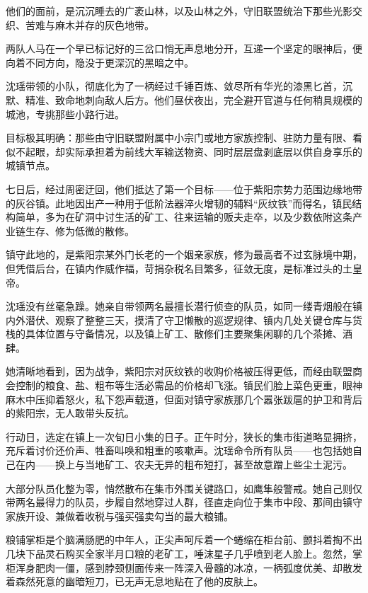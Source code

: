 他们的面前，是沉沉睡去的广袤山林，以及山林之外，守旧联盟统治下那些光影交织、苦难与麻木并存的灰色地带。

两队人马在一个早已标记好的三岔口悄无声息地分开，互递一个坚定的眼神后，便向着不同方向，隐没于更深沉的黑暗之中。

\vspace{2em}

沈瑶带领的小队，彻底化为了一柄经过千锤百炼、敛尽所有华光的漆黑匕首，沉默、精准、致命地刺向敌人后方。他们昼伏夜出，完全避开官道与任何稍具规模的城池，专挑那些小路行进。

目标极其明确：那些由守旧联盟附属中小宗门或地方家族控制、驻防力量有限、看似不起眼，却实际承担着为前线大军输送物资、同时层层盘剥底层以供自身享乐的城镇节点。

七日后，经过周密迂回，他们抵达了第一个目标——位于紫阳宗势力范围边缘地带的灰谷镇。此地因出产一种用于低阶法器淬火增韧的辅料“灰纹铁”而得名，镇民结构简单，多为在矿洞中讨生活的矿工、往来运输的贩夫走卒，以及少数依附这条产业链生存、修为低微的散修。

镇守此地的，是紫阳宗某外门长老的一个姻亲家族，修为最高者不过玄脉境中期，但凭借后台，在镇内作威作福，苛捐杂税名目繁多，征敛无度，是标准过头的土皇帝。

沈瑶没有丝毫急躁。她亲自带领两名最擅长潜行侦查的队员，如同一缕青烟般在镇内外潜伏、观察了整整三天，摸清了守卫懒散的巡逻规律、镇内几处关键仓库与货栈的具体位置与守备情况，以及镇上矿工、散修们主要聚集闲聊的几个茶摊、酒肆。

她清晰地看到，因为战争，紫阳宗对灰纹铁的收购价格被压得更低，而经由联盟商会控制的粮食、盐、粗布等生活必需品的价格却飞涨。镇民们脸上菜色更重，眼神麻木中压抑着怒火，私下怨声载道，但面对镇守家族那几个嚣张跋扈的护卫和背后的紫阳宗，无人敢带头反抗。

行动日，选定在镇上一次旬日小集的日子。正午时分，狭长的集市街道略显拥挤，充斥着讨价还价声、牲畜叫唤和粗重的咳嗽声。沈瑶命令所有队员——也包括她自己在内——换上与当地矿工、农夫无异的粗布短打，甚至故意蹭上些尘土泥污。

大部分队员化整为零，悄然散布在集市外围关键路口，如鹰隼般警戒。她自己则仅带两名最得力的队员，步履自然地穿过人群，径直走向位于集市中段、那间由镇守家族开设、兼做着收税与强买强卖勾当的最大粮铺。

粮铺掌柜是个脑满肠肥的中年人，正尖声呵斥着一个蜷缩在柜台前、颤抖着掏不出几块下品灵石购买全家半月口粮的老矿工，唾沫星子几乎喷到老人脸上。忽然，掌柜浑身肥肉一僵，感到脖颈侧面传来一阵深入骨髓的冰凉，一柄弧度优美、却散发着森然死意的幽暗短刀，已无声无息地贴在了他的皮肤上。


